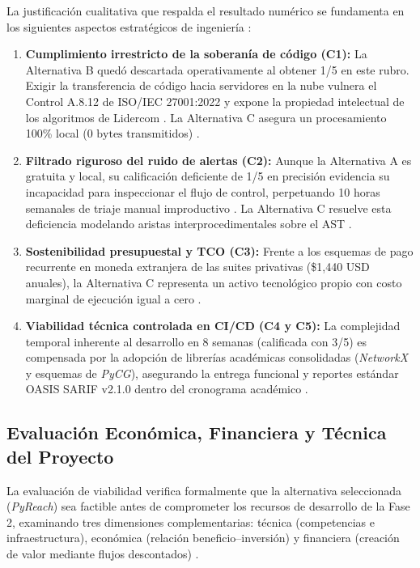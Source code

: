 La justificación cualitativa que respalda el resultado numérico se fundamenta en los siguientes aspectos estratégicos de ingeniería \parencite{wiegers2013software}: %
\begin{enumerate}[leftmargin=1.27cm, label=\alph*)]
    \item \textbf{Cumplimiento irrestricto de la soberanía de código (C1):} La Alternativa B quedó descartada operativamente al obtener 1/5 en este rubro. Exigir la transferencia de código hacia servidores en la nube vulnera el Control A.8.12 de ISO/IEC 27001:2022 y expone la propiedad intelectual de los algoritmos de Lidercom \parencite{ladisa2023sok}. La Alternativa C asegura un procesamiento 100\% local ($0\text{ bytes}$ transmitidos) \parencite{gutierrez2024auditoria}. %
    \item \textbf{Filtrado riguroso del ruido de alertas (C2):} Aunque la Alternativa A es gratuita y local, su calificación deficiente de 1/5 en precisión evidencia su incapacidad para inspeccionar el flujo de control, perpetuando 10 horas semanales de triaje manual improductivo \parencite{pashchenko2022vuln4real, sadowski2018lessons}. La Alternativa C resuelve esta deficiencia modelando aristas interprocedimentales sobre el AST \parencite{salis2021pycg}. %
    \item \textbf{Sostenibilidad presupuestal y TCO (C3):} Frente a los esquemas de pago recurrente en moneda extranjera de las suites privativas (\$1,440 USD anuales), la Alternativa C representa un activo tecnológico propio con costo marginal de ejecución igual a cero \parencite{gutierrez2024auditoria}. %
    \item \textbf{Viabilidad técnica controlada en CI/CD (C4 y C5):} La complejidad temporal inherente al desarrollo en 8 semanas (calificada con 3/5) es compensada por la adopción de librerías académicas consolidadas (\textit{NetworkX} y esquemas de \textit{PyCG}), asegurando la entrega funcional y reportes estándar OASIS SARIF v2.1.0 dentro del cronograma académico \parencite{hagberg2008exploring, oasis2019sarif}. 
\end{enumerate}

\subsection{Evaluación Económica, Financiera y Técnica del Proyecto}
La evaluación de viabilidad verifica formalmente que la alternativa seleccionada (\textit{PyReach}) sea factible antes de comprometer los recursos de desarrollo de la Fase 2, examinando tres dimensiones complementarias: técnica (competencias e infraestructura), económica (relación beneficio--inversión) y financiera (creación de valor mediante flujos descontados) \parencite{pressman2020software, torres2026proyecto}. %

